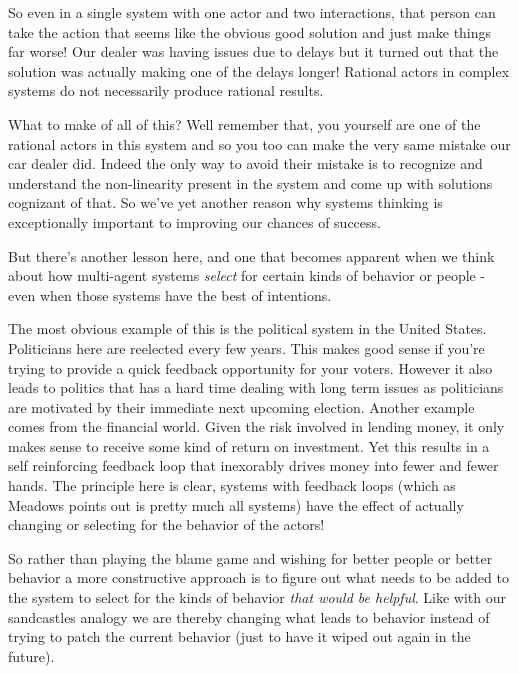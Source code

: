 \documentclass[11pt,a5paper]{book}
\begin{document}
So even in a single system with one actor and two interactions, that person can take the action that seems like the obvious good solution and just make things far worse! Our dealer was having issues due to delays but it turned out that the solution was actually making one of the delays longer! Rational actors in complex systems do not necessarily produce rational results. 
\newline

What to make of all of this? Well remember that, you yourself are one of the rational actors in this system and so you too can make the very same mistake our car dealer did. Indeed the only way to avoid their mistake is to recognize and understand the non-linearity present in the system and come up with solutions cognizant of that. So we've yet another reason why systems thinking is exceptionally important to improving our chances of success.
\newline

But there's another lesson here, and one that becomes apparent when we think about how multi-agent systems \textit{select} for certain kinds of behavior or people - even when those systems have the best of intentions.
\newline

The most obvious example of this is the political system in the United States. Politicians here are reelected every few years. This makes good sense if you're trying to provide a quick feedback opportunity for your voters. However it also leads to politics that has a hard time dealing with long term issues as politicians are motivated by their immediate next upcoming election. Another example comes from the financial world. Given the risk involved in lending money, it only makes sense to receive some kind of return on investment. Yet this results in a self reinforcing feedback loop that inexorably drives money into fewer and fewer hands. The principle here is clear, systems with feedback loops (which as Meadows points out is pretty much all systems) have the effect of actually changing or selecting for the behavior of the actors!
\newline

So rather than playing the blame game and wishing for better people or better behavior a more constructive approach is to figure out what needs to be added to the system to select for the kinds of behavior \textit{that would be helpful}. Like with our sandcastles analogy we are thereby changing what leads to behavior instead of trying to patch the current behavior (just to have it wiped out again in the future). 
\newline
\end{document}
